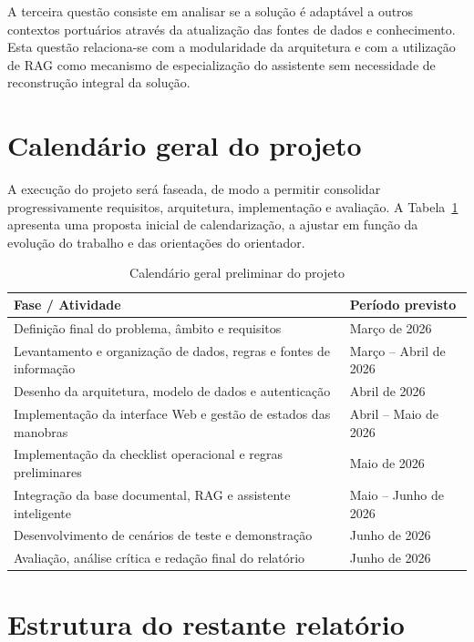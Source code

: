 \documentclass[a4paper,12pt]{report}
\begin{document}
A terceira questão consiste em analisar se a solução é adaptável a outros contextos portuários através da atualização das fontes de dados e conhecimento. Esta questão relaciona-se com a modularidade da arquitetura e com a utilização de RAG como mecanismo de especialização do assistente sem necessidade de reconstrução integral da solução.

\section{Calendário geral do projeto}

A execução do projeto será faseada, de modo a permitir consolidar progressivamente requisitos, arquitetura, implementação e avaliação. A Tabela~\ref{tab:calendario} apresenta uma proposta inicial de calendarização, a ajustar em função da evolução do trabalho e das orientações do orientador.

\begin{table}[H]
\centering
\caption{Calendário geral preliminar do projeto}
\label{tab:calendario}
\begin{tabular}{>{\raggedright\arraybackslash}p{7.5cm} >{\raggedright\arraybackslash}p{5cm}}
\toprule
\textbf{Fase / Atividade} & \textbf{Período previsto} \\
\midrule
Definição final do problema, âmbito e requisitos & Março de 2026 \\
Levantamento e organização de dados, regras e fontes de informação & Março -- Abril de 2026 \\
Desenho da arquitetura, modelo de dados e autenticação & Abril de 2026 \\
Implementação da interface Web e gestão de estados das manobras & Abril -- Maio de 2026 \\
Implementação da checklist operacional e regras preliminares & Maio de 2026 \\
Integração da base documental, RAG e assistente inteligente & Maio -- Junho de 2026 \\
Desenvolvimento de cenários de teste e demonstração & Junho de 2026 \\
Avaliação, análise crítica e redação final do relatório & Junho de 2026 \\
\bottomrule
\end{tabular}
\end{table}

\section{Estrutura do restante relatório}
\end{document}
